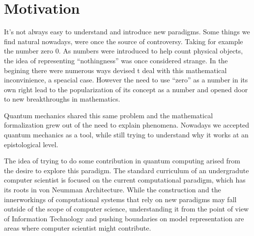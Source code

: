 \section{Motivation}
\label{sec:int_motivation}



It's not always easy to understand and introduce new paradigms. Some things we find natural nowadays, were once the source of controversy. Taking for example the number zero $0$. As numbers were introduced to help count physical objects, the idea of representing ``nothingness'' was once considered strange. In the begining there were numerous ways devised t deal with this mathematical inconvinience, a speacial case. However the need to use ``zero'' as a number in its own right lead to the popularization of its concept as a number and opened door to new breakthroughs in mathematics\cite{Kaplan2000}. 

Quantum mechanics shared this same problem and the mathematical formalization grew out of the need to explain phenomena\cite{Mehra1982}. Nowadays we  accepted quantum mechanics as a tool, while still trying to understand why it works at an epistological level. 

The idea of trying to do some contribution in quantum computing arised from the desire to explore this paradigm. The standard curriculum of an undergradute computer scientist is focused on the current computational paradigm, which has its roots in von Neumman Architecture\cite{neumann45edvac}. While the construction and the innerworkings of computational systems that rely on new paradigms may fall outside of the scope of computer science, understanding it from the point of view of Information Technology and pushing boundaries on model representation are areas where computer scientist might contribute.



